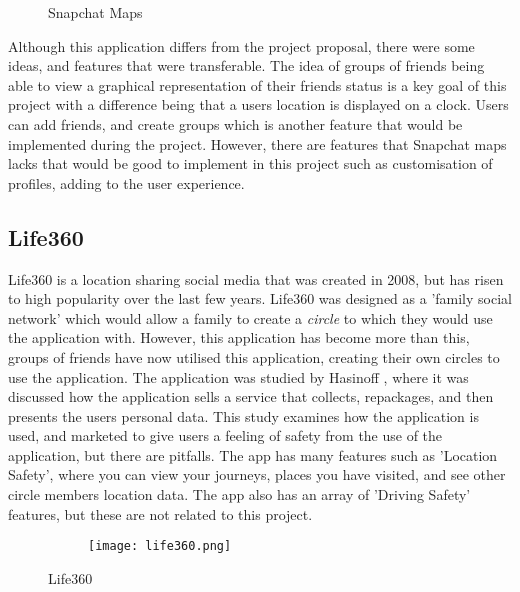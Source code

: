 \begin{figure}[!htbp]
    \centering
    \begin{subfigure}[b]{0.6\textwidth}
    \end{subfigure}
    \caption[Snapchat Maps]{Snapchat Maps \cite{snapMapImg}}
    \label{fig:snapMap}
\end{figure}
\FloatBarrier

Although this application differs from the project proposal, there were some ideas, and features that were transferable. The idea of groups of friends being able to view a graphical representation of their friends status is a key goal of this project with a difference being that a users location is displayed on a clock. Users can add friends, and create groups which is another feature that would be implemented during the project. However, there are features that Snapchat maps lacks that would be good to implement in this project such as customisation of profiles, adding to the user experience.

\subsection{Life360}

Life360 is a location sharing social media that was created in 2008, but has risen to high popularity over the last few years. Life360 was designed as a 'family social network' which would allow a family to create a \textit{circle} to which they would use the application with. However, this application has become more than this, groups of friends have now utilised this application, creating their own circles to use the application. The application was studied by Hasinoff \cite{life360}, where it was discussed how the application sells a service that collects, repackages, and then presents the users personal data. This study examines how the application is used, and marketed to give users a feeling of safety from the use of the application, but there are pitfalls. The app has many features such as 'Location Safety', where you can view your journeys, places you have visited, and see other circle members location data. The app also has an array of 'Driving Safety' features, but these are not related to this project. 

\begin{figure}[!htbp]
    \centering
    \begin{subfigure}[b]{0.21\textwidth}
        {\texttt{[image: life360.png]}}
    \end{subfigure}
    \caption[Life360]{Life360 \cite{lifeLoc}}
    \label{fig:life360}
\end{figure}
\FloatBarrier

